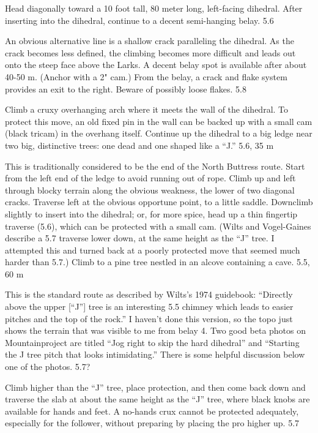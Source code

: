 \documentclass{tahquitz}
\begin{document}
 Head diagonally toward a 10 foot tall, 80 meter long, left-facing dihedral. After
inserting into the dihedral, continue to a decent semi-hanging belay. 5.6

 An obvious alternative line is a shallow crack paralleling the dihedral.
As the crack becomes less defined,
the climbing becomes more difficult and leads out onto the steep face above the Larks.
A decent belay spot is available after about 40-50 m. (Anchor with a 2" cam.)
From the belay, a crack and flake system provides an exit to the right. 
Beware of possibly loose flakes. 5.8

 Climb a cruxy overhanging arch where it meets the wall of the dihedral.
To protect this move, an old fixed pin in the wall can be backed up with
a small cam (black tricam) in the overhang itself.
Continue up the dihedral to a big ledge near two big, distinctive
trees: one dead and one shaped like a ``J.'' 5.6, 35 m


 This is traditionally considered to be the end of the
North Buttress route. Start from the left end of the ledge to avoid
running out of rope. Climb up and left through blocky terrain along the obvious weakness, the
lower of two diagonal cracks. Traverse left at the obvious opportune point, to a
little saddle. Downclimb slightly to insert into the dihedral; or, for more spice,
head up a thin fingertip traverse (5.6),
which can be protected with a small cam. (Wilts and Vogel-Gaines describe a 5.7 traverse lower
down, at the same height as the ``J'' tree. I attempted this and turned back at a poorly
protected move that seemed much harder than 5.7.)
Climb to a pine tree nestled in an alcove containing a cave. 5.5, 60 m

 This is the standard route as described by Wilts's 1974 guidebook:
``Directly above the upper [``J''] tree is an interesting 5.5 chimney which leads
to easier pitches and the top of the rock.''
I haven't done this version, so the topo just shows the terrain that was visible
to me from belay 4. Two good beta
photos on Mountainproject are titled ``Jog right to skip the hard dihedral''
and ``Starting the J tree pitch that looks intimidating.''
There is some helpful discussion below one of the photos. 5.7?

 Climb higher than the ``J'' tree, place protection, and then come
back down and traverse the slab at about the same height as the ``J'' tree, where black
knobs are available for hands and feet. A no-hands crux cannot be protected adequately,
especially for the follower, without preparing by placing the pro higher up. 5.7
\end{document}
